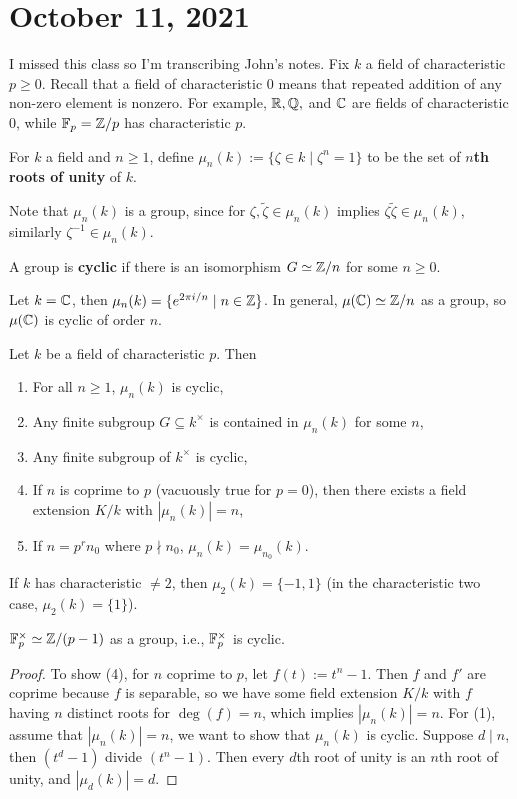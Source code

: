 \section{October 11, 2021} 
I missed this class so I'm transcribing John's notes. Fix $k$ a field of characteristic $p \geq 0$. Recall that a field of characteristic 0 means that repeated addition of any non-zero element is nonzero. For example, $\mathbb{R},\mathbb{Q},$ and $\mathbb{C}$ are fields of characteristic 0, while $\mathbb{F}_p = \mathbb{Z} /p$ has characteristic $p$. 
\begin{definition}[]
    For $k$ a field and $n \geq 1$, define $\mu _n (k) :=\{\zeta \in k \mid  \zeta ^n =1\} $ to be the set of $n$\textbf{th roots of unity} of $k$.
\end{definition}
Note that $\mu_n (k)$ is a group, since for $\zeta, \widetilde \zeta \in \mu _n (k)$ implies $\zeta \widetilde \zeta \in \mu_n (k)$, similarly $\zeta^{-1} \in \mu_n (k)$.
\begin{definition}[]
    A group is \textbf{cyclic} if there is an isomorphism $G \simeq  \mathbb{Z} /n$ for some $n \geq 0$.
\end{definition}
\begin{example}
    Let $k=\mathbb{C}$, then $\mu_n (k)= \{e^{2\pi i /n} \mid  n \in \mathbb{Z}\} $. In general, $\mu(\mathbb{C}) \simeq  \mathbb{Z} /n$ as a group, so $\mu(\mathbb{C})$ is cyclic of order $n$.
\end{example}
\begin{prop}
    Let $k$ be a field of characteristic $p$. Then 
    \begin{enumerate}[label=(\arabic*)]
    \setlength\itemsep{-.2em}
\item For all $n\geq 1$, $\mu_n (k)$ is cyclic,
\item Any finite subgroup $G \subseteq k ^{\times }$ is contained in $\mu_n (k)$ for some $n$,
\item Any finite subgroup of $k ^{\times }$ is cyclic, 
\item If $n$ is coprime to $p$ (vacuously true for $p=0$), then there exists a field extension $K /k$ with $|\mu _n (k)|=n$,
\item If $n=p^r n_0$ where $p \nmid n_0$, $\mu_n (k)=\mu_{n_0}(k)$.
    \end{enumerate}
\end{prop}
\begin{example}
    If $k$ has characteristic $\neq 2$, then $\mu_2(k)= \{-1,1\} $ (in the characteristic two case, $\mu_2(k)=\{1\} $).
\end{example}
\begin{cor}
    $\mathbb{F}_p ^{\times }\simeq  \mathbb{Z} / (p-1)$ as a group, i.e., $\mathbb{F}_p ^{\times }$ is cyclic.
\end{cor}
\begin{proof}
    To show (4), for $n$ coprime to $p$, let $f(t):=t ^n -1$. Then  $f$ and $f'$ are coprime because $f$ is separable, so we have some field extension $K /k$ with $f$ having $n$ distinct roots for $\deg (f) =n$, which implies $|\mu_n (k)|=n$. For (1), assume that $|\mu _n (k)|=n$, we want to show that $\mu_n (k)$ is cyclic. Suppose $d \mid n$, then $(t^d -1)$ divide $(t ^n -1)$. Then every $d$th root of unity is an $n$th root of unity, and $|\mu_d(k)|=d$. 
\end{proof}
